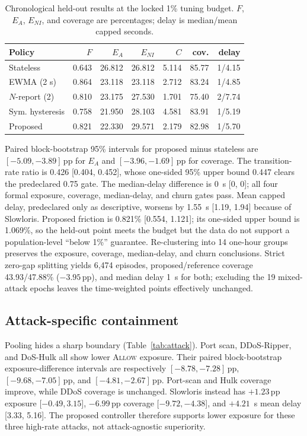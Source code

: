 \documentclass[journal,10pt]{IEEEtran}
\newcommand{\Allow}{\textsc{Allow}}
\newcommand{\pp}{\,\mathrm{pp}}
\begin{document}
\begin{table}[t]
\caption{Chronological held-out results at the locked 1\% tuning budget. $F$, $E_A$, $E_{NI}$, and coverage are percentages; delay is median/mean capped seconds.}
\label{tab:aggregate}
\centering
\scriptsize
\setlength{\tabcolsep}{2.45pt}
\begin{tabular}{@{}lrrrrrr@{}}
\toprule
Policy & $F$ & $E_A$ & $E_{NI}$ & $C$ & cov. & delay \\
\midrule
Stateless       & 0.643 & 26.812 & 26.812 & 5.114 & 85.77 & 1/4.15 \\
EWMA (2 s)      & 0.864 & 23.118 & 23.118 & 2.712 & 83.24 & 1/4.85 \\
$N$-report (2)  & 0.810 & 23.175 & 27.530 & 1.701 & 75.40 & 2/7.74 \\
Sym. hysteresis & 0.758 & 21.950 & 28.103 & 4.581 & 83.91 & 1/5.19 \\
Proposed        & 0.821 & 22.330 & 29.571 & 2.179 & 82.98 & 1/5.70 \\
\bottomrule
\end{tabular}
\end{table}

Paired block-bootstrap 95\% intervals for proposed minus stateless are $[-5.09,-3.89]\pp$ for $E_A$ and $[-3.96,-1.69]\pp$ for coverage. The transition-rate ratio is 0.426 [0.404, 0.452], whose one-sided 95\% upper bound 0.447 clears the predeclared 0.75 gate. The median-delay difference is 0~s [0, 0]; all four formal exposure, coverage, median-delay, and churn gates pass. Mean capped delay, predeclared only as descriptive, worsens by 1.55~s [1.19, 1.94] because of Slowloris. Proposed friction is 0.821\% [0.554, 1.121]; its one-sided upper bound is 1.069\%, so the held-out point meets the budget but the data do not support a population-level ``below 1\%'' guarantee. Re-clustering into 14 one-hour groups preserves the exposure, coverage, median-delay, and churn conclusions. Strict zero-gap splitting yields 6,474 episodes, proposed/reference coverage 43.93/47.88\% ($-3.95\pp$), and median delay 1~s for both; excluding the 19 mixed-attack epochs leaves the time-weighted points effectively unchanged.

\subsection{Attack-specific containment}
Pooling hides a sharp boundary (Table~\ref{tab:attack}). Port scan, DDoS-Ripper, and DoS-Hulk all show lower \Allow{} exposure. Their paired block-bootstrap exposure-difference intervals are respectively $[-8.78,-7.28]\pp$, $[-9.68,-7.05]\pp$, and $[-4.81,-2.67]\pp$. Port-scan and Hulk coverage improve, while DDoS coverage is unchanged. Slowloris instead has $+1.23\pp$ exposure [${-0.49},3.15$], $-6.99\pp$ coverage [${-9.72},{-4.38}$], and $+4.21$~s mean delay [3.33, 5.16]. The proposed controller therefore supports lower exposure for these three high-rate attacks, not attack-agnostic superiority.
\end{document}
